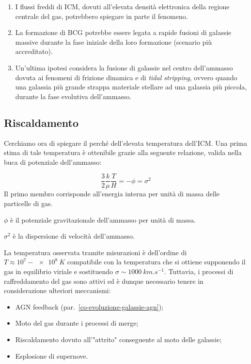 \begin{enumerate}
    \item I flussi freddi di ICM, dovuti all’elevata densità elettronica della regione centrale del gas, potrebbero spiegare in parte il fenomeno.
    \item La formazione di BCG potrebbe essere legata a rapide fusioni di galassie massive durante la fase iniziale della loro formazione (scenario più accreditato).
    \item Un'ultima ipotesi considera la fusione di galassie nel centro dell’ammasso dovuta ai fenomeni di frizione dinamica e di \emph{tidal stripping}, ovvero quando una galassia più grande strappa materiale stellare ad una galassia più piccola, durante la fase evolutiva dell’ammasso.
\end{enumerate}

\subsection{Riscaldamento}
Cerchiamo ora di spiegare il perché dell'elevata temperatura dell'ICM.
Una prima stima di tale temperatura è ottenibile grazie alla seguente relazione, valida nella buca di potenziale dell'ammasso:

\begin{equation}
    \frac{3}{2} \frac{k}{\mu} \frac{T}{H} = -\phi =\sigma^2
\end{equation}
Il primo membro corrisponde all'energia interna per unità di massa delle particelle di gas.
\begin{description}
    \item $\phi$ è il potenziale gravitazionale dell'ammasso per unità di massa.
    \item $\sigma^2$ è la dispersione di velocità dell'ammasso.
\end{description}
La temperatura osservata tramite misurazioni è dell'ordine di $T \approx 10^7-\SI{e8}{K} $ compatibile con la temperatura che si ottiene supponendo il gas in equilibrio viriale e sostituendo $\sigma \sim \SI{1000}{km.s^{-1}}$.
Tuttavia, i processi di raffreddamento del gas sono attivi ed è dunque necessario tenere in considerazione ulteriori meccanismi:

\begin{itemize}
    \item AGN feedback (par.~\ref{co-evoluzione-galassie-agn});
    \item Moto del gas durante i processi di merge;
    \item Riscaldamento dovuto all'"attrito" conseguente al moto delle galassie;
    \item Esplosione di supernove.
\end{itemize}

